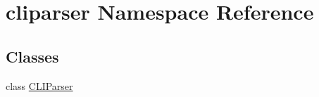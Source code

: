 \hypertarget{namespacecliparser}{
\section{cliparser \-Namespace \-Reference}
\label{namespacecliparser}
}
\subsection*{\-Classes}
\begin{DoxyCompactItemize}
\item 
class \hyperlink{classcliparser_1_1CLIParser}{\-C\-L\-I\-Parser}
\end{DoxyCompactItemize}
